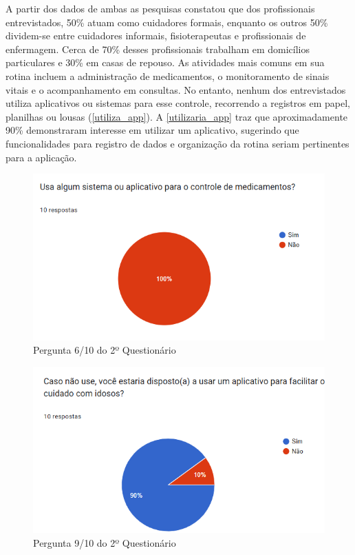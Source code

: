 \documentclass[
	article,			%
	12pt,				%
	oneside,			%
	a4paper,			%
    BIBLATEX,           %
	english,			%
	brazil,				%
	sumario=tradicional
	]{abntex2}
\begin{document}
A partir dos dados de ambas as pesquisas constatou que dos profissionais entrevistados, 50\% atuam como cuidadores formais, enquanto os outros 50\% dividem-se entre cuidadores informais, fisioterapeutas e profissionais de enfermagem. Cerca de 70\% desses profissionais trabalham em domicílios particulares e 30\% em casas de repouso. As atividades mais comuns em sua rotina incluem a administração de medicamentos, o monitoramento de sinais vitais e o acompanhamento em consultas. No entanto, nenhum dos entrevistados utiliza aplicativos ou sistemas para esse controle, recorrendo a registros em papel, planilhas ou lousas (\autoref{utiliza_app}). A \autoref{utilizaria_app} traz que aproximadamente 90\% demonstraram interesse em utilizar um aplicativo, sugerindo que funcionalidades para registro de dados e organização da rotina seriam pertinentes para a aplicação.

\begin{figure}[!htbp]
    \centering
    \includegraphics[width=0.75\linewidth]{assets/figuras/utiliza-app.png}
    \caption{Pergunta 6/10 do 2º Questionário}
    \label{utiliza_app}
\end{figure}

\begin{figure}[!htbp]
    \centering
    \includegraphics[width=0.75\linewidth]{assets/figuras/utilizaria-app.png}
    \caption{Pergunta 9/10 do 2º Questionário}
    \label{utilizaria_app}
\end{figure}
\end{document}
